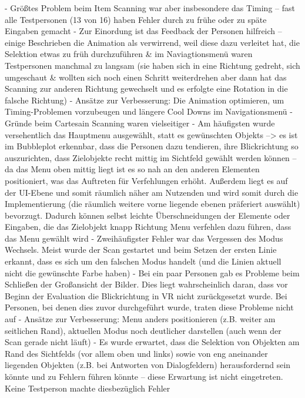 -	Größtes Problem beim Item Scanning war aber insbesondere das Timing – fast alle Testpersonen (13 von 16) haben Fehler durch zu frühe oder zu späte Eingaben gemacht 
-	Zur Einordung ist das Feedback der Personen hilfreich – einige Beschrieben die Animation als verwirrend, weil diese dazu verleitet hat, die Selektion etwas zu früh durchzuführen \& im Naviagtionsmenü waren Testpersonen manchmal zu langsam (sie haben sich in eine Richtung gedreht, sich umgeschaut \& wollten sich noch einen Schritt weiterdrehen aber dann hat das Scanning zur anderen Richtung gewechselt und es erfolgte eine Rotation in die falsche Richtung) 
-	Ansätze zur Verbesserung: Die Animation optimieren, um Timing-Problemen vorzubeugen und längere Cool Downs im Navigationsmenü 
-	Gründe beim Cartesain Scanning waren vielseitiger 
-	Am häufigsten wurde versehentlich das Hauptmenu ausgewählt, statt es gewünschten Objekts --> es ist im Bubbleplot erkennbar, dass die Personen dazu tendieren, ihre Blickrichtung so auszurichten, dass Zielobjekte recht mittig im Sichtfeld gewählt werden können – da das Menu oben mittig liegt ist es so nah an den anderen Elementen positioniert, was das Auftreten für Verfehlungen erhöht. Außerdem liegt es auf der UI-Ebene und somit räumlich näher am Nutzenden und wird somit durch die Implementierung (die räumlich weitere vorne liegende ebenen präferiert auswählt) bevorzugt. Dadurch können selbst leichte Überschneidungen der Elemente oder Eingaben, die das Zielobjekt knapp Richtung Menu verfehlen dazu führen, dass das Menu gewählt wird  
-	Zweihäufigster Fehler war das Vergessen des Modus Wechsels. Meist wurde der Scan gestartet und beim Setzen der ersten Linie erkannt, dass es sich um den falschen Modus handelt (und die Linien aktuell nicht die gewünschte Farbe haben)  
-	Bei ein paar Personen gab es Probleme beim Schließen der Großansicht der Bilder. Dies liegt wahrscheinlich daran, dass vor Beginn der Evaluation die Blickrichtung in VR nicht zurückgesetzt wurde. Bei Personen, bei denen dies zuvor durchgeführt wurde, traten diese Probleme nicht auf 
-	Ansätze zur Verbesserung: Menu anders positionieren (z.B. weiter am seitlichen Rand), aktuellen Modus noch deutlicher darstellen (auch wenn der Scan gerade nicht läuft) 
-	Es wurde erwartet, dass die Selektion von Objekten am Rand des Sichtfelds (vor allem oben und links) sowie von eng aneinander liegenden Objekten (z.B. bei Antworten von Dialogfeldern) herausfordernd sein könnte und zu Fehlern führen könnte – diese Erwartung ist nicht eingetreten. Keine Testperson machte diesbezüglich Fehler 

